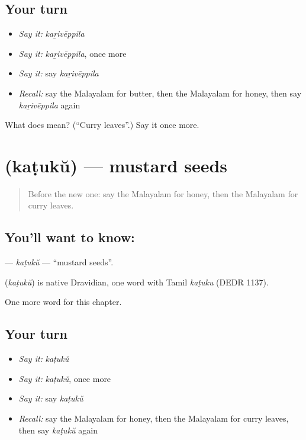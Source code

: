 \subsection*{Your turn}
\begin{itemize}
\raggedright
  \item \emph{Say it:} \emph{kaṟivēppila}
  \item \emph{Say it:} \emph{kaṟivēppila}, once more
  \item \emph{Say it:} say \emph{kaṟivēppila}
  \item \emph{Recall:} say the Malayalam for butter, then the Malayalam for honey, then say \emph{kaṟivēppila} again
\end{itemize}

\begin{tcolorbox}[breakable,colback=teal!4,colframe=teal!35!black,title={Before you move on}]
What does  mean? (\textquotedblleft{}Curry leaves\textquotedblright{}.) Say it once more.
\end{tcolorbox}
\section[\texorpdfstring{\ml{കടുക്} (kaṭukŭ)}{കടുക് (kaṭukŭ)}]{ (kaṭukŭ) — mustard seeds}

\label{lesson:ML-C209-katuku}



\begin{quote}
Before the new one: say the Malayalam for honey, then the Malayalam for curry leaves.
\end{quote}

\subsection*{You'll want to know: }
\textbf{} — \emph{kaṭukŭ} — \textquotedblleft{}mustard seeds\textquotedblright{}.

\begin{cousinweb}
\textbf{} (\emph{kaṭukŭ}) is native Dravidian, one word with Tamil \emph{kaṭuku} (DEDR 1137).
\end{cousinweb}

\begin{grammarlens}[title={What you've built}]
One more word for this chapter.
\end{grammarlens}

\subsection*{Your turn}
\begin{itemize}
\raggedright
  \item \emph{Say it:} \emph{kaṭukŭ}
  \item \emph{Say it:} \emph{kaṭukŭ}, once more
  \item \emph{Say it:} say \emph{kaṭukŭ}
  \item \emph{Recall:} say the Malayalam for honey, then the Malayalam for curry leaves, then say \emph{kaṭukŭ} again
\end{itemize}

